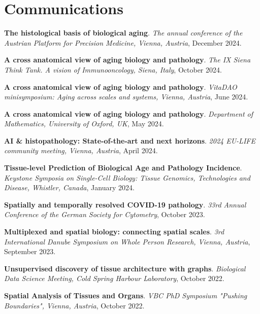\documentclass[11pt,a4paper,roman]{moderncv} %
\begin{document}
\section{Communications}
        \begin{etaremune}[leftmargin=1.0cm,itemindent=0pt,topsep=10pt,itemsep=2pt,partopsep=0pt,parsep=0pt]
        \item
        \textbf{The histological basis of biological aging}. \textit{The annual conference of the Austrian Platform for Precision Medicine, Vienna, Austria}, December 2024.
        \item
        \textbf{A cross anatomical view of aging biology and pathology}. \textit{The IX Siena Think Tank. A vision of Immunooncology, Siena, Italy}, October 2024.
        \item
        \textbf{A cross anatomical view of aging biology and pathology}. \textit{VitaDAO minisymposium: Aging across scales and systems, Vienna, Austria}, June 2024.
        \item
        \textbf{A cross anatomical view of aging biology and pathology}. \textit{Department of Mathematics, University of Oxford, UK}, May 2024.
        \item
        \textbf{AI \& histopathology: State-of-the-art and next horizons}. \textit{2024 EU-LIFE community meeting, Vienna, Austria}, April 2024.
        \item
        \textbf{Tissue-level Prediction of Biological Age and Pathology Incidence}. \textit{Keystone Symposia on Single-Cell Biology: Tissue Genomics, Technologies and Disease, Whistler, Canada}, January 2024.
        \item
        \textbf{Spatially and temporally resolved COVID-19 pathology}. \textit{33rd Annual Conference of the German Society for Cytometry}, October 2023.
        \item
        \textbf{Multiplexed and spatial biology: connecting spatial scales}. \textit{3rd International Danube Symposium on Whole Person Research, Vienna, Austria}, September 2023.
        \item
        \textbf{Unsupervised discovery of tissue architecture with graphs}. \textit{Biological Data Science Meeting, Cold Spring Harbour Laboratory}, October 2022.
        \item
        \textbf{Spatial Analysis of Tissues and Organs}. \textit{VBC PhD Symposium "Pushing Boundaries", Vienna, Austria}, October 2022.
        \item

\end{etaremune}
\end{document}
